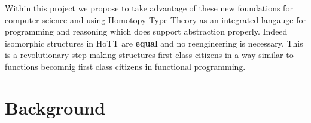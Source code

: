 \documentclass[twocolumn,a4paper,11pt]{article}
\begin{document}
{Within this project we propose to take advantage of these new
foundations for computer science and using Homotopy Type Theory as an
integrated langauge for programming and reasoning which does support
abstraction properly. Indeed isomorphic structures in HoTT are
\textbf{equal} and no reengineering is necessary. This is a
revolutionary step making structures first class citizens in a way
similar to functions becomnig first class citizens in functional
programming.  



\section{Background}

}
\end{document}
